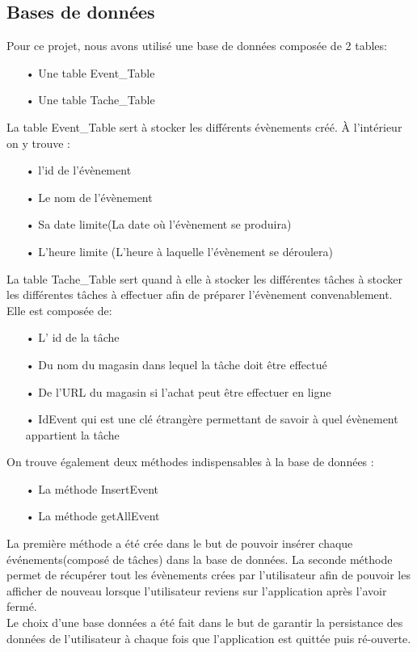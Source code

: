 \documentclass[12pt,a4paper]{report}
\begin{document}
\subsection{Bases de données}
\begin{flushleft}
\justify
Pour ce projet, nous avons utilisé une base de données composée de 2 tables:
\begin{itemize}
\item[•] Une table Event\_Table
\item[•] Une table Tache\_Table
\end{itemize}
\medskip
La table Event\_Table sert à stocker les différents évènements créé. À l'intérieur on y trouve :
\begin{itemize}
\item[•] l'id de l'évènement
\item[•] Le nom de l'évènement
\item[•] Sa date limite(La date où l'évènement se produira)
\item[•] L'heure limite (L'heure à laquelle l'évènement se déroulera)
\end{itemize}
\medskip 
La table Tache\_Table sert quand à elle à stocker les différentes tâches à stocker les différentes tâches à effectuer afin de préparer l'évènement convenablement. Elle est composée de:
\begin{itemize}
\item[•] L' id de la tâche
\item[•] Du nom du magasin dans lequel la tâche doit être effectué
\item[•] De l'URL du magasin si l'achat peut être effectuer en ligne
\item[•] IdEvent qui est une clé étrangère permettant de savoir à quel évènement appartient la tâche
\end{itemize}
\medskip 
On trouve également deux méthodes indispensables à la base de données :
\begin{itemize}
\item[•] La méthode InsertEvent
\item[•] La méthode getAllEvent
\end{itemize}
\medskip 
La première méthode a été crée dans le but de pouvoir insérer chaque événements(composé de tâches) dans la base de données. La seconde méthode permet de récupérer tout les évènements crées par l'utilisateur afin de pouvoir les afficher de nouveau lorsque l'utilisateur reviens sur l'application après l'avoir fermé. \\
Le choix d'une base données a été fait dans le but de garantir la persistance des données de l'utilisateur à chaque fois que l'application est quittée puis ré-ouverte.


\end{flushleft}
\end{document}
